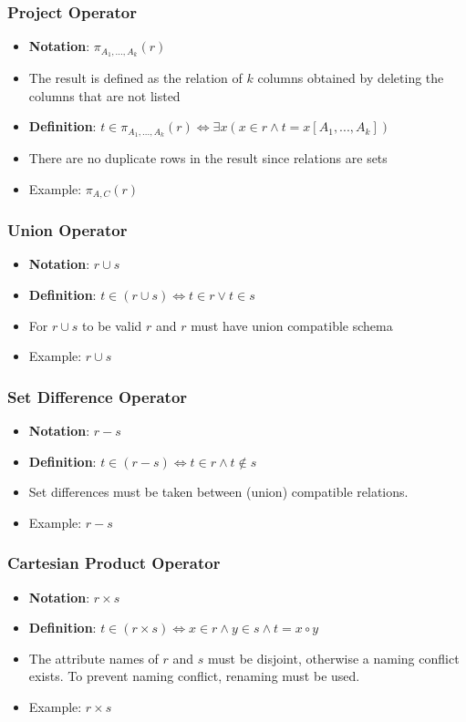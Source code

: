 \subsubsection{Project Operator}
\begin{itemize}
    \item \textbf{Notation}: $\pi_{A_1,...,A_k}(r)$
    \item The result is defined as the relation of $k$ columns obtained by deleting the columns that are not listed
    \item \textbf{Definition}: $t\in \pi_{A_1,...,A_k}(r) \Leftrightarrow \exists x(x\in r \land t = x[A_1,...,A_k])$
    \item There are no duplicate rows in the result since relations are sets
    \item Example: $\pi_{A,C}(r)$
\end{itemize}

\subsubsection{Union Operator}
\begin{itemize}
    \item \textbf{Notation}: $r \cup s$
    \item \textbf{Definition}: $t\in (r\cup s) \Leftrightarrow t \in r \lor t \in s$
    \item For $r\cup s$ to be valid $r$ and $r$ must have union compatible schema
    \item Example: $r \cup s$
\end{itemize}

\subsubsection{Set Difference Operator}
\begin{itemize}
    \item \textbf{Notation}: $r-s$
    \item \textbf{Definition}: $t\in (r-s) \Leftrightarrow t \in r \land t \notin s$
    \item Set differences must be taken between (union) compatible relations.
    \item Example: $r-s$
\end{itemize}

\subsubsection{Cartesian Product Operator}
\begin{itemize}
    \item \textbf{Notation}: $r \times s$
    \item \textbf{Definition}: $t \in (r \times s) \Leftrightarrow x \in r \land y \in s \land t = x \circ y$
    \item The attribute names of $r$ and $s$ must be disjoint, otherwise a naming conflict exists. To prevent naming conflict, renaming must be used.
    \item Example: $r \times s$
\end{itemize}

